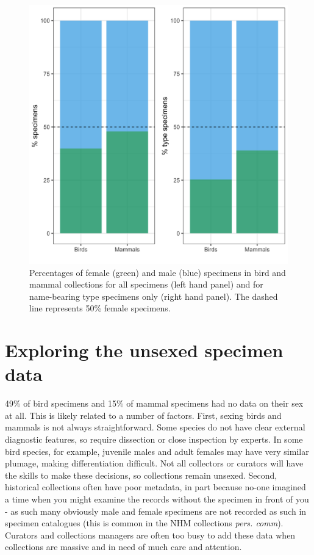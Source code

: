 \documentclass[a4paper, 12pt]{article}
\begin{document}
\begin{figure}[H]
 \centering
  \includegraphics[width = \linewidth]{figures/types-all.png}
  \caption{Percentages of female (green) and male (blue) specimens in bird and mammal collections for all specimens (left hand panel) and for name-bearing type specimens only (right hand panel). 
  The dashed line represents 50\% female specimens.}
  \label{fig-types}
\end{figure}

\newpage
\section{Exploring the unsexed specimen data}

49\% of bird specimens and 15\% of mammal specimens had no data on their sex at all. This is likely related to a number of factors. 
First, sexing birds and mammals is not always straightforward. Some species do not have clear external diagnostic features, so require dissection or close inspection by experts. 
In some bird species, for example, juvenile males and adult females may have very similar plumage, making differentiation difficult. 
Not all collectors or curators will have the skills to make these decisions, so collections remain unsexed. 
Second, historical collections often have poor metadata, in part because no-one imagined a time when you might examine the records without the specimen in front of you - as such many obviously male and female specimens are not recorded as such in specimen catalogues (this is common in the NHM collections \textit{pers. comm}).
 Curators and collections managers are often too busy to add these data when collections are massive and in need of much care and attention. 
\end{document}
